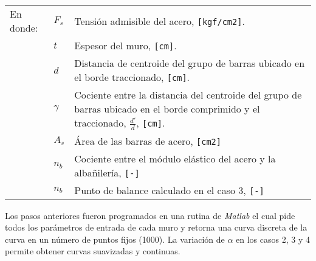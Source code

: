 \begin{itemize}
	\vspace{-0.2cm}
	\begin{table}[H]
		\centering
		\begin{tabular}{lp{1cm}p{9.0cm}}
			En donde:	& $F_s$ & Tensión admisible del acero, \texttt{[kgf/cm2]}.\\
		    & $t$ & Espesor del muro, \texttt{[cm]}.\\
			& $d$ & Distancia  de centroide del grupo de barras ubicado en el borde traccionado, \texttt{[cm]}.\\
			& $\gamma$ & Cociente entre la distancia del centroide del grupo de barras ubicado en el borde comprimido y el traccionado, $\frac{d'}{d}$, \texttt{[cm]}.\\
			& $A_s$ & Área de las barras de acero, \texttt{[cm2]}\\
			& $n_b$ & Cociente entre el módulo elástico del acero y la albañilería, \texttt{[-]}\\
			& $n_b$ & Punto de balance calculado en el caso 3, \texttt{[-]}\\
		\end{tabular}
	\end{table}
	
\end{itemize}

Los pasos anteriores fueron programados en una rutina de \textit{Matlab} el cual pide todos los parámetros de entrada de cada muro y retorna una curva discreta de la curva en un número de puntos fijos (1000). La variación de $\alpha$ en los casos 2, 3 y 4 permite obtener curvas suavizadas y continuas.


